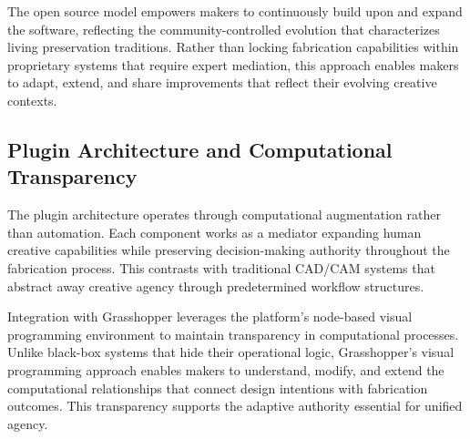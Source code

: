 The open source model empowers makers to continuously build upon and expand the software, reflecting the community-controlled evolution that characterizes living preservation traditions. Rather than locking fabrication capabilities within proprietary systems that require expert mediation, this approach enables makers to adapt, extend, and share improvements that reflect their evolving creative contexts.

\subsection{Plugin Architecture and Computational Transparency}

The plugin architecture operates through computational augmentation rather than automation. Each component works as a mediator expanding human creative capabilities while preserving decision-making authority throughout the fabrication process. This contrasts with traditional CAD/CAM systems that abstract away creative agency through predetermined workflow structures.

\vspace{0.5cm}

Integration with Grasshopper leverages the platform's node-based visual programming environment to maintain transparency in computational processes. Unlike black-box systems that hide their operational logic, Grasshopper's visual programming approach enables makers to understand, modify, and extend the computational relationships that connect design intentions with fabrication outcomes. This transparency supports the adaptive authority essential for unified agency.

